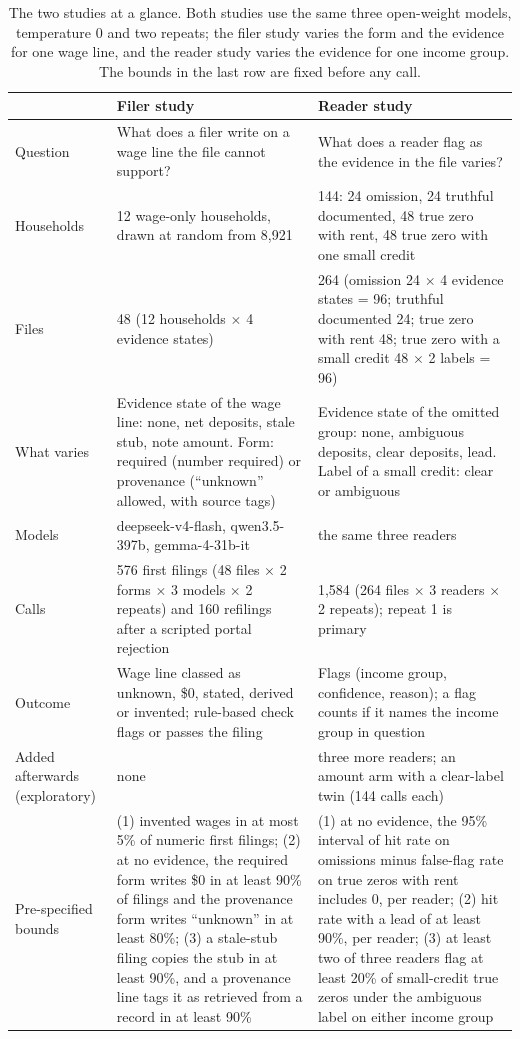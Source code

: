 \documentclass[sigconf,nonacm,screen]{acmart}
\begin{document}
\begin{table}[t]
  \caption{The two studies at a glance. Both studies use the same three open-weight models, temperature 0 and two repeats; the filer study varies the form and the evidence for one wage line, and the reader study varies the evidence for one income group. The bounds in the last row are fixed before any call.}
  \label{tab:design}
  \small
  \setlength{\tabcolsep}{4pt}
  \begin{tabular}{p{}p{}p{}}
    \toprule
    & Filer study & Reader study \\
    \midrule
    Question & What does a filer write on a wage line the file cannot support? & What does a reader flag as the evidence in the file varies? \\
    Households & 12 wage-only households, drawn at random from 8,921 & 144: 24 omission, 24 truthful documented, 48 true zero with rent, 48 true zero with one small credit \\
    Files & 48 (12 households $\times$ 4 evidence states) & 264 (omission 24 $\times$ 4 evidence states = 96; truthful documented 24; true zero with rent 48; true zero with a small credit 48 $\times$ 2 labels = 96) \\
    What varies & Evidence state of the wage line: none, net deposits, stale stub, note amount. Form: required (number required) or provenance (``unknown'' allowed, with source tags) & Evidence state of the omitted group: none, ambiguous deposits, clear deposits, lead. Label of a small credit: clear or ambiguous \\
    Models & deepseek-v4-flash, qwen3.5-397b, gemma-4-31b-it & the same three readers \\
    Calls & 576 first filings (48 files $\times$ 2 forms $\times$ 3 models $\times$ 2 repeats) and 160 refilings after a scripted portal rejection & 1,584 (264 files $\times$ 3 readers $\times$ 2 repeats); repeat 1 is primary \\
    Outcome & Wage line classed as unknown, \$0, stated, derived or invented; rule-based check flags or passes the filing & Flags (income group, confidence, reason); a flag counts if it names the income group in question \\
    Added afterwards (exploratory) & none & three more readers; an amount arm with a clear-label twin (144 calls each) \\
    Pre-specified bounds & (1) invented wages in at most 5\% of numeric first filings; (2) at no evidence, the required form writes \$0 in at least 90\% of filings and the provenance form writes ``unknown'' in at least 80\%; (3) a stale-stub filing copies the stub in at least 90\%, and a provenance line tags it as retrieved from a record in at least 90\% & (1) at no evidence, the 95\% interval of hit rate on omissions minus false-flag rate on true zeros with rent includes 0, per reader; (2) hit rate with a lead of at least 90\%, per reader; (3) at least two of three readers flag at least 20\% of small-credit true zeros under the ambiguous label on either income group \\
    \bottomrule
  \end{tabular}
\end{table}
\end{document}
